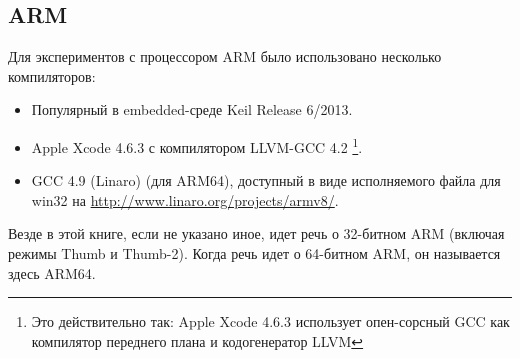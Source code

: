 \subsection{ARM}
\label{sec:hw_ARM}

\myindex{\idevices}
Для экспериментов с процессором ARM было использовано несколько компиляторов:

\begin{itemize}
\item Популярный в embedded-среде Keil Release 6/2013.

\item Apple Xcode 4.6.3 с компилятором LLVM-GCC 4.2
\footnote{Это действительно так: Apple Xcode 4.6.3 использует опен-сорсный GCC как компилятор переднего плана и кодогенератор LLVM}.

\item GCC 4.9 (Linaro) (для ARM64), 
доступный в виде исполняемого файла для win32 на \url{http://www.linaro.org/projects/armv8/}.

\end{itemize}

Везде в этой книге, если не указано иное, идет речь о 32-битном ARM (включая режимы Thumb и Thumb-2).
Когда речь идет о 64-битном ARM, он называется здесь ARM64.







